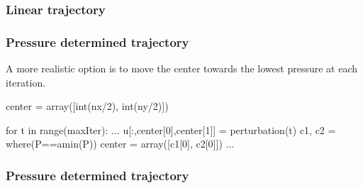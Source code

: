 \documentclass{beamer}
\begin{document}
\begin{frame}[fragile]
\frametitle{Linear trajectory}
\begin{center}
\end{center}

\end{frame}

\begin{frame}[fragile]
\frametitle{Pressure determined trajectory}

A more realistic option is to move the center towards the lowest pressure at each iteration.\\
\bigskip\bigskip

\begin{python}
center = array([int(nx/2), int(ny/2)])

for t in range(maxIter):
   ...
   u[:,center[0],center[1]] = perturbation(t)
   c1, c2 = where(P==amin(P))
   center = array([c1[0], c2[0]])
   ...

\end{python}

\end{frame}

\begin{frame}[fragile]
\frametitle{Pressure determined trajectory}
\begin{center}

\end{center}
\end{frame}
\end{document}
